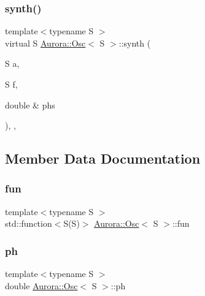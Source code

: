 \subsubsection{\texorpdfstring{synth()}{synth()}}
{\footnotesize\ttfamily template$<$typename S $>$ \\
virtual S \hyperlink{class_aurora_1_1_osc}{Aurora\+::\+Osc}$<$ S $>$\+::synth (\begin{DoxyParamCaption}\item[{S}]{a,  }\item[{S}]{f,  }\item[{double \&}]{phs }\end{DoxyParamCaption})\hspace{0.3cm}{\ttfamily [inline]}, {\ttfamily [protected]}, {\ttfamily [virtual]}}



\subsection{Member Data Documentation}
\mbox{\label{class_aurora_1_1_osc_a18c443a23a6d1fc2e63ba1ee09e97bc4}} 
\subsubsection{\texorpdfstring{fun}{fun}}
{\footnotesize\ttfamily template$<$typename S $>$ \\
std\+::function$<$S(S)$>$ \hyperlink{class_aurora_1_1_osc}{Aurora\+::\+Osc}$<$ S $>$\+::fun\hspace{0.3cm}{\ttfamily [protected]}}

\mbox{\label{class_aurora_1_1_osc_ac649d41b585b377b17eeba66a18dbcc2}} 
\subsubsection{\texorpdfstring{ph}{ph}}
{\footnotesize\ttfamily template$<$typename S $>$ \\
double \hyperlink{class_aurora_1_1_osc}{Aurora\+::\+Osc}$<$ S $>$\+::ph\hspace{0.3cm}{\ttfamily [protected]}}

\mbox{\label{class_aurora_1_1_osc_a2c7ae380eade4eee2e6035856ed0dcbe}} 
